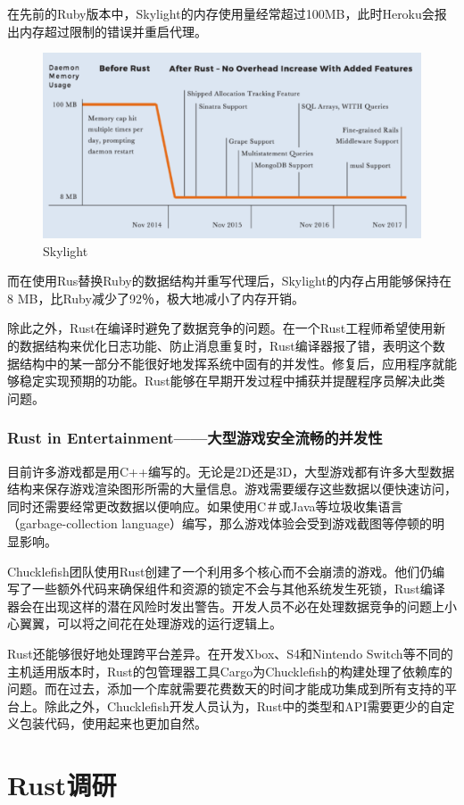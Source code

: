 \documentclass[12pt, a4paper]{article}
\begin{document}
		在先前的Ruby版本中，Skylight的内存使用量经常超过100MB，此时Heroku会报出内存超过限制的错误并重启代理。
		\begin{figure}[H]
			\centering
			\includegraphics[width=0.7\linewidth]{Z2}
			\caption{Skylight}
			\label{fig:southeast2}
		\end{figure}
		而在使用Rus替换Ruby的数据结构并重写代理后，Skylight的内存占用能够保持在8 MB，比Ruby减少了92％，极大地减小了内存开销。
		
		除此之外，Rust在编译时避免了数据竞争的问题。在一个Rust工程师希望使用新的数据结构来优化日志功能、防止消息重复时，Rust编译器报了错，表明这个数据结构中的某一部分不能很好地发挥系统中固有的并发性。修复后，应用程序就能够稳定实现预期的功能。Rust能够在早期开发过程中捕获并提醒程序员解决此类问题。
		
		\subsubsection{Rust in Entertainment——大型游戏安全流畅的并发性}
		目前许多游戏都是用C++编写的。无论是2D还是3D，大型游戏都有许多大型数据结构来保存游戏渲染图形所需的大量信息。游戏需要缓存这些数据以便快速访问，同时还需要经常更改数据以便响应。如果使用C＃或Java等垃圾收集语言（garbage-collection language）编写，那么游戏体验会受到游戏截图等停顿的明显影响。
		
		Chucklefish团队使用Rust创建了一个利用多个核心而不会崩溃的游戏。他们仍编写了一些额外代码来确保组件和资源的锁定不会与其他系统发生死锁，Rust编译器会在出现这样的潜在风险时发出警告。开发人员不必在处理数据竞争的问题上小心翼翼，可以将之间花在处理游戏的运行逻辑上。
		
		Rust还能够很好地处理跨平台差异。在开发Xbox、S4和Nintendo Switch等不同的主机适用版本时，Rust的包管理器工具Cargo为Chucklefish的构建处理了依赖库的问题。而在过去，添加一个库就需要花费数天的时间才能成功集成到所有支持的平台上。除此之外，Chucklefish开发人员认为，Rust中的类型和API需要更少的自定义包装代码，使用起来也更加自然。
		
	\section{Rust调研}
\end{document}
